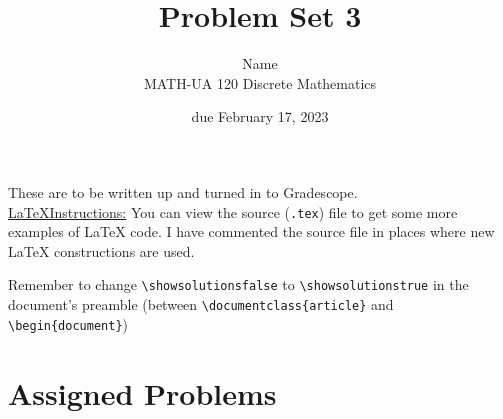 \documentclass{article}
\title{Problem Set 3}
\author{%
    Name
\\  MATH-UA 120 Discrete Mathematics
}
\date{due February 17, 2023}
\newif\ifshowsolutions
\newcommand{\danger}{\marginpar[\hfill\dbend]{\dbend\hfill}}
\theoremstyle{definition}
\begin{document}
\maketitle



These are to be written up and turned in to Gradescope.\\



\ifshowsolutions
    \SetupExSheets{solution/print=true}
\else
    \danger
 \underline{ \LaTeX  Instructions:}  You can view the source (\texttt{.tex}) file to get some more examples of \LaTeX{} code.  I have commented the source file in places where new \LaTeX{} constructions are used.
  
  Remember to change \verb|\showsolutionsfalse| to \verb|\showsolutionstrue|
    in the document's preamble 
    (between \verb|\documentclass{article}| and \verb|\begin{document}|)
\fi

\section*{Assigned Problems}
\end{document}
